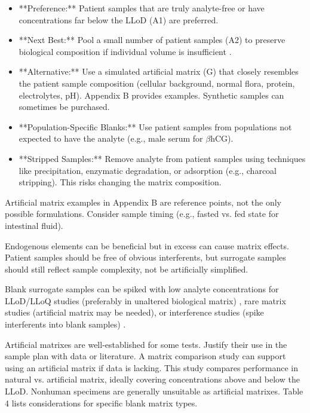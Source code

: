 \documentclass{article}
\begin{document}
\begin{itemize}
    \item **Preference:** Patient samples that are truly analyte-free or have concentrations far below the LLoD (A1) are preferred.
    \item **Next Best:** Pool a small number of patient samples (A2) to preserve biological composition if individual volume is insufficient \cite{CLSIEP17}.
    \item **Alternative:** Use a simulated artificial matrix (G) that closely resembles the patient sample composition (cellular background, normal flora, protein, electrolytes, pH). Appendix B provides examples. Synthetic samples can sometimes be purchased.
    \item **Population-Specific Blanks:** Use patient samples from populations not expected to have the analyte (e.g., male serum for $\beta$hCG).
    \item **Stripped Samples:** Remove analyte from patient samples using techniques like precipitation, enzymatic degradation, or adsorption (e.g., charcoal stripping). This risks changing the matrix composition.
\end{itemize}

Artificial matrix examples in Appendix B are reference points, not the only possible formulations. Consider sample timing (e.g., fasted vs. fed state for intestinal fluid).

Endogenous elements can be beneficial but in excess can cause matrix effects. Patient samples should be free of obvious interferents, but surrogate samples should still reflect sample complexity, not be artificially simplified.

Blank surrogate samples can be spiked with low analyte concentrations for LLoD/LLoQ studies (preferably in unaltered biological matrix) \cite{CLSIEP17}, rare matrix studies (artificial matrix may be needed), or interference studies (spike interferents into blank samples) \cite{CLSIEP07, CLSIEP37}.

Artificial matrixes are well-established for some tests. Justify their use in the sample plan with data or literature. A matrix comparison study can support using an artificial matrix if data is lacking. This study compares performance in natural vs. artificial matrix, ideally covering concentrations above and below the LLoD. Nonhuman specimens are generally unsuitable as artificial matrixes. Table 4 lists considerations for specific blank matrix types.
\end{document}
